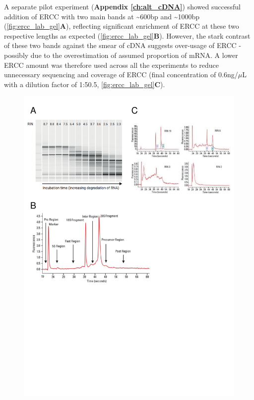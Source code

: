 A separate pilot experiment (\textbf{Appendix \ref{ch:alt_cDNA}}) showed successful addition of ERCC with two main bands at \textasciitilde600bp and \textasciitilde1000bp (\cref{fig:ercc_lab_gel}\textbf{A}), reflecting significant enrichment of ERCC at these two respective lengths as expected (\cref{fig:ercc_lab_gel}\textbf{B}). However, the stark contrast of these two bands against the smear of cDNA suggests over-usage of ERCC - possibly due to the overestimation of assumed proportion of mRNA. A lower ERCC amount was therefore used across all the experiments to reduce unnecessary sequencing and coverage of ERCC (final concentration of 0.6ng/$\mu$L with a dilution factor of 1:50.5, \cref{fig:ercc_lab_gel}\textbf{C}). 

\vspace{1cm}
\begin{figure}[!htp]
	\begin{center}
		\includegraphics[page=4,trim={0 8cm 0 1cm},clip,scale = 0.65]{Figures/General_Methodology_Figures.pdf}

\end{center}
\end{figure}
